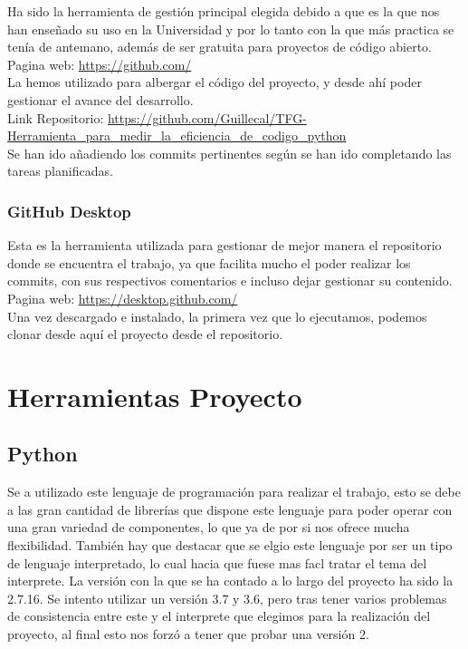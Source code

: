 Ha sido la herramienta de gestión principal elegida debido a que es la que nos han enseñado su uso en la Universidad y por lo tanto con la que más practica se tenía de antemano, además de ser gratuita para proyectos de código abierto.\\

Pagina web: \url{https://github.com/} \\

La hemos utilizado para albergar el código del proyecto, y desde ahí poder gestionar el avance del desarrollo.\\

Link Repositorio: \url{https://github.com/Guillecal/TFG-Herramienta_para_medir_la_eficiencia_de_codigo_python} \\

Se han ido añadiendo los commits pertinentes según se han ido completando las tareas planificadas.

\subsubsection{GitHub Desktop}

Esta es la herramienta utilizada para gestionar de mejor manera el repositorio donde se encuentra el trabajo, ya que facilita mucho el poder realizar los commits, con sus respectivos comentarios e incluso dejar gestionar su contenido.\\

Pagina web: \url{https://desktop.github.com/} \\

Una vez descargado e instalado, la primera vez que lo ejecutamos, podemos clonar desde aquí el proyecto desde el repositorio.


\section{Herramientas Proyecto}

\subsection{Python}

Se a utilizado este lenguaje de programación para realizar el trabajo, esto se debe a las gran cantidad de librerías que dispone este lenguaje para poder operar con una gran variedad de componentes, lo que ya de por si nos ofrece mucha flexibilidad. También hay que destacar que se elgio este lenguaje por ser un tipo de lenguaje interpretado, lo cual hacia que fuese mas facl tratar el tema del interprete.
La versión con la que se ha contado a lo largo del proyecto ha sido la 2.7.16. Se intento utilizar un versión 3.7 y 3.6, pero tras tener varios problemas de consistencia entre este y el interprete que elegimos para la realización del proyecto, al final esto nos forzó a tener que probar una versión 2.\\


